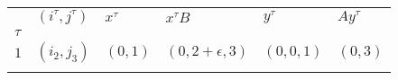 \begin{tabular}{llllll}
    \toprule
    {} &       $(i^\tau, j^\tau)$ &             $x^\tau$ &               $x^{\tau}B$ &                $y^\tau$ &                 $Ay^\tau$ \\
    $\tau$ &                &                         &                           &                         &                           \\
    \midrule
    $1$         &  $(i_2, j_3)$ &  $(0, 1)$ &  $(0, 2 + \epsilon, 3)$ &  $(0, 0, 1)$ &  $(0 , 3)$\\
    \bottomrule
    \\
    \end{tabular}